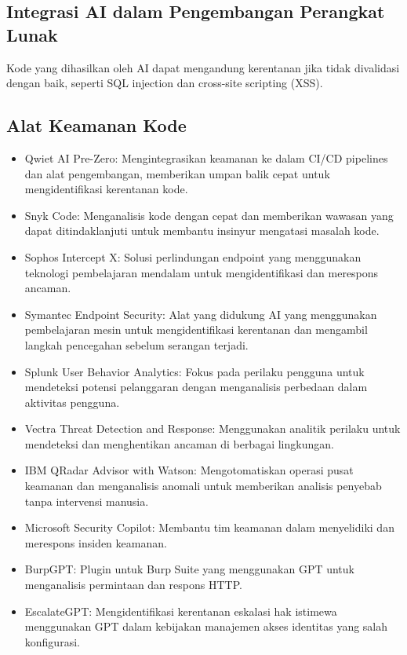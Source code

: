 \documentclass{article}
\begin{document}
\subsection{Integrasi AI dalam Pengembangan Perangkat Lunak}
Kode yang dihasilkan oleh AI dapat mengandung kerentanan jika tidak divalidasi dengan baik, seperti SQL injection dan cross-site scripting (XSS).

\subsection{Alat Keamanan Kode}
\begin{itemize}
    \item Qwiet AI Pre-Zero: Mengintegrasikan keamanan ke dalam CI/CD pipelines dan alat pengembangan, memberikan umpan balik cepat untuk mengidentifikasi kerentanan kode.
    \item Snyk Code: Menganalisis kode dengan cepat dan memberikan wawasan yang dapat ditindaklanjuti untuk membantu insinyur mengatasi masalah kode.
    \item Sophos Intercept X: Solusi perlindungan endpoint yang menggunakan teknologi pembelajaran mendalam untuk mengidentifikasi dan merespons ancaman.
    \item Symantec Endpoint Security: Alat yang didukung AI yang menggunakan pembelajaran mesin untuk mengidentifikasi kerentanan dan mengambil langkah pencegahan sebelum serangan terjadi.
    \item Splunk User Behavior Analytics: Fokus pada perilaku pengguna untuk mendeteksi potensi pelanggaran dengan menganalisis perbedaan dalam aktivitas pengguna.
    \item Vectra Threat Detection and Response: Menggunakan analitik perilaku untuk mendeteksi dan menghentikan ancaman di berbagai lingkungan.
    \item IBM QRadar Advisor with Watson: Mengotomatiskan operasi pusat keamanan dan menganalisis anomali untuk memberikan analisis penyebab tanpa intervensi manusia.
    \item Microsoft Security Copilot: Membantu tim keamanan dalam menyelidiki dan merespons insiden keamanan.
    \item BurpGPT: Plugin untuk Burp Suite yang menggunakan GPT untuk menganalisis permintaan dan respons HTTP.
    \item EscalateGPT: Mengidentifikasi kerentanan eskalasi hak istimewa menggunakan GPT dalam kebijakan manajemen akses identitas yang salah konfigurasi.
\end{itemize}
\end{document}
